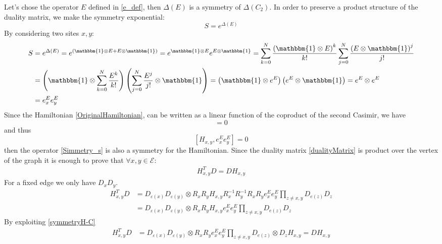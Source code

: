 \documentclass[11pt]{article}
\numberwithin{equation}{section}
\begin{document}
Let's chose the operator $E$ defined in \eqref{e_def}, then $\Delta(E)$ is a symmetry of $\Delta(C_{2})$.
In order to preserve a product structure of the duality matrix, we make the symmetry exponential:
\begin{equation}\label{Simmetry_s}
	S=e^{\Delta(E)}
\end{equation}
By considering two sites $x,y$:
\begin{equation}
	\begin{split}
		S&=e^{\Delta(E)}=e^{(\mathbbm{1}\otimes E+E\otimes \mathbbm{1})}=e^{\mathbbm{1}\otimes E}e^{E\otimes \mathbbm{1}}=\sum_{k=0}^{N}\frac{\left(\mathbbm{1}\otimes E\right)^{k}}{k!}\sum_{j=0}^{N}\frac{\left(E\otimes \mathbbm{1}\right)^{j}}{j!}
		\\&=
		\left(\mathbbm{1}\otimes \sum_{k=0}^{N}\frac{E^{k}}{k!}\right)\left(\sum_{j=0}^{N}\frac{E^{j}}{j!}\otimes \mathbbm{1}\right)=\left(\mathbbm{1}\otimes e^{E}\right)\left(e^{E}\otimes \mathbbm{1}\right)=e^{E}\otimes e^{E}
		\\&=e_{x}^{E} e^{E}_{y}
	\end{split}
\end{equation}
Since the Hamiltonian \eqref{OriginalHamiltonian}, can be written as a linear function of the coproduct of the second Casimir, we have \begin{equation}[H_{x,y},e^{\Delta (C_{2})}]=0\end{equation} and thus \begin{equation}\label{symmetryH-C}[H_{x,y},e^{E}_{x}e^{E}_{y}]=0\end{equation} then the operator \eqref{Simmetry_s} is also a symmetry for the Hamiltonian. 
Since the duality matrix \eqref{dualityMatrix} is product over the vertex of the graph it is enough to prove that $\forall x,y\in \mathcal{E}$:
\begin{align}
	H_{x,y}^{T}D=DH_{x,y}\label{bulkDuality}
\end{align}
For a fixed edge we only have $D_{x}D_{y}$. 
\begin{align*}
	H_{x,y}^{T}D&=D_{\varepsilon(x)}D_{\varepsilon(y)}\otimes R_{x}R_{y}H_{x,y}R_{x}^{-1}R_{y}^{-1}R_{x}R_{y}e^{E}_{x}e^{E}_{y}\prod_{z\neq x,y}D_{e(z)}D_{z}
	\\&=
	D_{\varepsilon(x)}D_{\varepsilon(y)}\otimes R_{x}R_{y}H_{x,y}e^{E}_{x}e^{E}_{y}\prod_{z\neq x,y}D_{e(z)}D_{z}
\end{align*} 
By exploiting \eqref{symmetryH-C}
\begin{align*}
	H_{x,y}^{T}D&=	D_{\varepsilon(x)}D_{\varepsilon(y)}\otimes R_{x}R_{y}e^{E}_{x}e^{E}_{y}\prod_{z\neq x,y}D_{e(z)}\otimes D_{z}H_{x,y}=
	DH_{x,y}
\end{align*}
\end{document}
